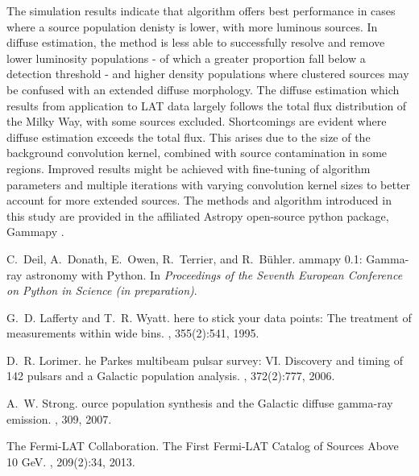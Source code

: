 \documentclass{PoS}
\begin{document}
The simulation results indicate that algorithm offers best performance in cases where a source population denisty is lower, with more luminous sources. In diffuse estimation, the method is less able to successfully resolve and remove lower luminosity populations - of which a greater proportion fall below a detection threshold - and higher density populations where clustered sources may be confused with an extended diffuse morphology. The diffuse estimation which results from application to LAT data largely follows the total flux distribution of the Milky Way, with some sources excluded. Shortcomings are evident where diffuse estimation exceeds the total flux. This arises due to the size of the background convolution kernel, combined with source contamination in some regions. Improved results might be achieved with fine-tuning of algorithm parameters and multiple iterations with varying convolution kernel sizes to better account for more extended sources. The methods and algorithm introduced in this study are provided in the affiliated Astropy open-source python package, Gammapy \cite{Deil}.

\begin{thebibliography}{99}

C.~Deil, A.~Donath, E.~Owen, R.~Terrier, and R.~B{\"{u}}hler.
ammapy {0.1}: {G}amma-ray astronomy with {P}ython.
\newblock In {\em {P}roceedings of the {S}eventh {E}uropean {C}onference on
  {P}ython in {S}cience (in preparation)}.

G.~D. Lafferty and T.~R. Wyatt.
here to stick your data points: {T}he treatment of measurements
  within wide bins.
,
  355(2):541, 1995.

D.~R. Lorimer.
he {P}arkes multibeam pulsar survey: {VI.} {D}iscovery and timing
  of 142 pulsars and a {G}alactic population analysis.
, 372(2):777,
  2006.

A.~W. Strong.
ource population synthesis and the {G}alactic diffuse gamma-ray
  emission.
, 309, 2007.

{The Fermi-LAT Collaboration}.
\newblock The {F}irst {Fermi-LAT} {C}atalog of {S}ources {A}bove 10 {GeV}.
, 209(2):34, 2013.


\end{thebibliography}
\end{document}
